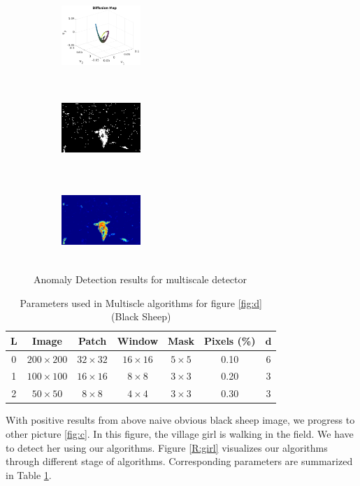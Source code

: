 \begin{figure}[t!]
\medskip
\begin{subfigure}{0.32\textwidth}
\includegraphics[height=3cm,width=3cm]{./Figures/sheep/3.png}
\caption{}
\end{subfigure}\hspace*{\fill}
\begin{subfigure}{0.32\textwidth}
\includegraphics[height=3cm,width=3cm]{./Figures/sheep/5.png}
\caption{} 
\end{subfigure}
\begin{subfigure}{0.32\textwidth}
\includegraphics[height=3cm,width=3cm]{./Figures/sheep/6.png}
\caption{} 
\end{subfigure}

\caption{Anomaly Detection results for multiscale detector} \label{R:sheep}
\end{figure}


\begin{table}
\caption{Parameters used in Multiscle algorithms for figure \ref{fig:d} (Black Sheep)}
\begin{center}
 \begin{tabular}{c c c c c c c} 
  \hline\hline 
 $\mathbf{L}$ & Image & Patch & Window & Mask & Pixels (\%) & $\mathbf{d}$\\ [0.5ex]   
 \hline
 0 & $200\times200$ & $32\times32$ & $16\times16$ & $5\times5$ & 0.10 & 6 \\ 
 
 1 & $100\times100$ & $16\times16$ & $8\times8$ & $3\times3$ & 0.20 & 3 \\
 
 2 & $50\times50$ & $8\times8$ & $4\times4$ & $3\times3$ & 0.30 & 3 \\ [1ex] 
\hline
\end{tabular}
\end{center}
\label{T:sheep}
\end{table}
With positive results from above naive obvious black sheep image, we progress to other picture \ref{fig:c}. In this figure, the village girl is walking in the field. We have to detect her using our algorithms. Figure \ref{R:girl} visualizes our algorithms through different stage of algorithms. Corresponding parameters are summarized in Table \ref{T:sheep}.

